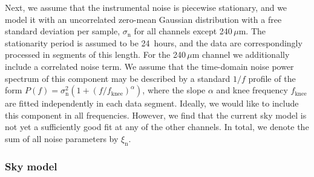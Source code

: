 \documentclass{aa}
\begin{document}
Next, we assume that the instrumental noise is piecewise stationary,
and we model it with an uncorrelated zero-mean Gaussian distribution
with a free standard deviation per sample, $\sigma_{\mathrm{n}}$ for
all channels except 240\,$\mu$m. The stationarity period is assumed to
be 24~hours, and the data are correspondingly processed in segments of
this length. For the 240\,$\mu$m channel we additionally include a
correlated noise term.  We assume that the time-domain noise power
spectrum of this component may be described by a standard $1/f$
profile of the form $P(f) = \sigma_{\mathrm{n}}^2
(1+(f/f_{\mathrm{knee}})^{\alpha})$, where the slope $\alpha$ and knee
frequency $f_{\mathrm{knee}}$ are fitted independently in each data
segment. Ideally, we would like to include this component in all
frequencies. However, we find that the current sky model is not yet
a sufficiently good fit at any of the other channels. In
total, we denote the sum of all noise parameters by
$\xi_{\mathrm{n}}$.


\subsubsection{Sky model}
\label{sec:skymodel}
\end{document}
